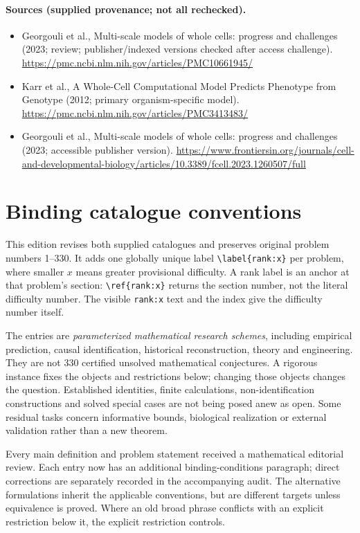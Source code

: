 \documentclass[11pt]{article}
\begin{document}
\paragraph{Sources (supplied provenance; not all rechecked).}
\begin{itemize}
\item Georgouli et al., Multi-scale models of whole cells: progress and challenges (2023; review; publisher/indexed versions checked after access challenge). \url{https://pmc.ncbi.nlm.nih.gov/articles/PMC10661945/}
\item Karr et al., A Whole-Cell Computational Model Predicts Phenotype from Genotype (2012; primary organism-specific model). \url{https://pmc.ncbi.nlm.nih.gov/articles/PMC3413483/}
\item Georgouli et al., Multi-scale models of whole cells: progress and challenges (2023; accessible publisher version). \url{https://www.frontiersin.org/journals/cell-and-developmental-biology/articles/10.3389/fcell.2023.1260507/full}
\end{itemize}


\section*{Binding catalogue conventions}
This edition revises both supplied catalogues and preserves original problem numbers 1--330. It adds one globally unique label \verb|\label{rank:x}| per problem, where smaller $x$ means greater provisional difficulty. A rank label is an anchor at that problem's section: \verb|\ref{rank:x}| returns the section number, not the literal difficulty number. The visible \texttt{rank:x} text and the index give the difficulty number itself.

The entries are \emph{parameterized mathematical research schemes}, including empirical prediction, causal identification, historical reconstruction, theory and engineering. They are not 330 certified unsolved mathematical conjectures. A rigorous instance fixes the objects and restrictions below; changing those objects changes the question. Established identities, finite calculations, non-identification constructions and solved special cases are not being posed anew as open. Some residual tasks concern informative bounds, biological realization or external validation rather than a new theorem.

Every main definition and problem statement received a mathematical editorial review. Each entry now has an additional binding-conditions paragraph; direct corrections are separately recorded in the accompanying audit. The alternative formulations inherit the applicable conventions, but are different targets unless equivalence is proved. Where an old broad phrase conflicts with an explicit restriction below it, the explicit restriction controls.
\end{document}
